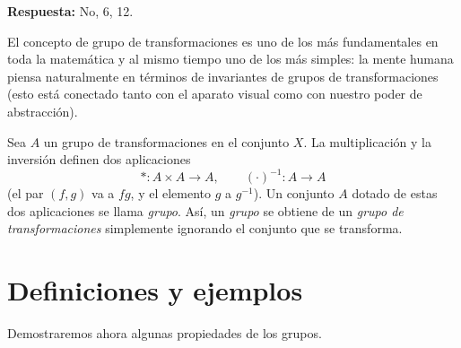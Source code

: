 \noindent\textbf{Respuesta:} No, 6, 12.

\vspace{0.4cm}

El concepto de grupo de transformaciones es uno de los más fundamentales en toda la matemática y al mismo tiempo uno de los más simples: la mente humana piensa naturalmente en términos de invariantes de grupos de transformaciones (esto está conectado tanto con el aparato visual como con nuestro poder de abstracción).

Sea $A$ un grupo de transformaciones en el conjunto $X$. La multiplicación y la inversión definen dos aplicaciones
\[
* : A \times A \to A, \qquad (\cdot)^{-1} : A\to A
\]
(el par $(f,g)$ va a $fg$, y el elemento $g$ a $g^{-1}$). Un conjunto $A$ dotado de estas dos aplicaciones se llama \textit{grupo}. Así, un \textit{grupo} se obtiene de un \textit{grupo de transformaciones} simplemente ignorando el conjunto que se transforma.

\clearpage
\section{Definiciones y ejemplos}


Demostraremos ahora algunas propiedades de los grupos.

